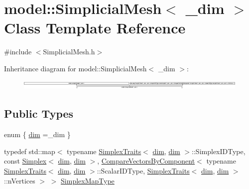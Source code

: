 \hypertarget{classmodel_1_1_simplicial_mesh}{}\section{model\+:\+:Simplicial\+Mesh$<$ \+\_\+dim $>$ Class Template Reference}
\label{classmodel_1_1_simplicial_mesh}


{\ttfamily \#include $<$Simplicial\+Mesh.\+h$>$}

Inheritance diagram for model\+:\+:Simplicial\+Mesh$<$ \+\_\+dim $>$\+:\begin{figure}[H]
\begin{center}
\leavevmode
\includegraphics[height=0.472574cm]{classmodel_1_1_simplicial_mesh}
\end{center}
\end{figure}
\subsection*{Public Types}
\begin{DoxyCompactItemize}
\item 
enum \{ \hyperlink{classmodel_1_1_simplicial_mesh_ad468b9bb3c67ec696a104445990d356ea29115db50a11d5e61cc38bf2db030e66}{dim} =\+\_\+dim
 \}
\item 
typedef std\+::map$<$ typename \hyperlink{structmodel_1_1_simplex_traits}{Simplex\+Traits}$<$ \hyperlink{classmodel_1_1_simplicial_mesh_ad468b9bb3c67ec696a104445990d356ea29115db50a11d5e61cc38bf2db030e66}{dim}, \hyperlink{classmodel_1_1_simplicial_mesh_ad468b9bb3c67ec696a104445990d356ea29115db50a11d5e61cc38bf2db030e66}{dim} $>$\+::Simplex\+I\+D\+Type, const \hyperlink{classmodel_1_1_simplex}{Simplex}$<$ \hyperlink{classmodel_1_1_simplicial_mesh_ad468b9bb3c67ec696a104445990d356ea29115db50a11d5e61cc38bf2db030e66}{dim}, \hyperlink{classmodel_1_1_simplicial_mesh_ad468b9bb3c67ec696a104445990d356ea29115db50a11d5e61cc38bf2db030e66}{dim} $>$, \hyperlink{structmodel_1_1_compare_vectors_by_component}{Compare\+Vectors\+By\+Component}$<$ typename \hyperlink{structmodel_1_1_simplex_traits}{Simplex\+Traits}$<$ \hyperlink{classmodel_1_1_simplicial_mesh_ad468b9bb3c67ec696a104445990d356ea29115db50a11d5e61cc38bf2db030e66}{dim}, \hyperlink{classmodel_1_1_simplicial_mesh_ad468b9bb3c67ec696a104445990d356ea29115db50a11d5e61cc38bf2db030e66}{dim} $>$\+::Scalar\+I\+D\+Type, \hyperlink{structmodel_1_1_simplex_traits}{Simplex\+Traits}$<$ \hyperlink{classmodel_1_1_simplicial_mesh_ad468b9bb3c67ec696a104445990d356ea29115db50a11d5e61cc38bf2db030e66}{dim}, \hyperlink{classmodel_1_1_simplicial_mesh_ad468b9bb3c67ec696a104445990d356ea29115db50a11d5e61cc38bf2db030e66}{dim} $>$\+::n\+Vertices $>$ $>$ \hyperlink{classmodel_1_1_simplicial_mesh_aa65b22398919503e2183a0cbe5e0f2e7}{Simplex\+Map\+Type}
\end{DoxyCompactItemize}
